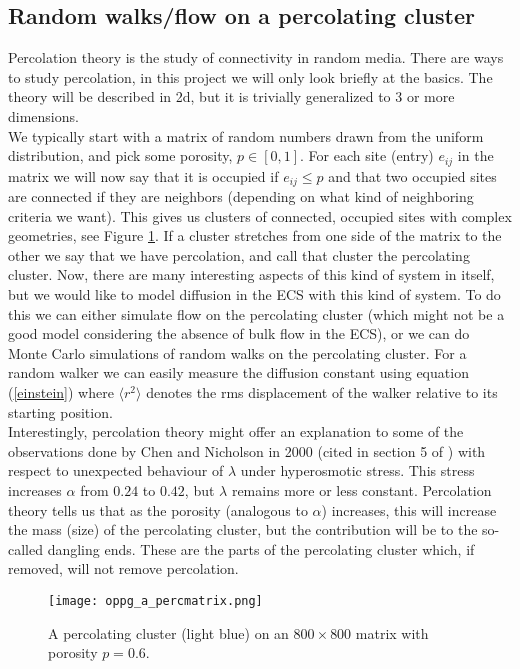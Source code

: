 \documentclass[a4paper,english, 12pt, twoside]{article}
\begin{document}
\subsection{Random walks/flow on a percolating cluster}
Percolation theory is the study of connectivity in random media. There are ways to study percolation, in this project we will only look briefly at the basics. The theory will be described in 2d, but it is trivially generalized to 3 or more dimensions.\\
We typically start with a matrix of random numbers drawn from the uniform distribution, and pick some porosity, $p\in[0,1]$. 
For each site (entry) $e_{ij}$ in the matrix we will now say that it is occupied if $e_{ij} \leq p$ and that two occupied sites are connected if they are neighbors (depending on what kind of neighboring criteria we want). 
This gives us clusters of connected, occupied sites with complex geometries, see Figure \ref{perc}. 
If a cluster stretches from one side of the matrix to the other we say that we have percolation, and call that cluster the percolating cluster. 
Now, there are many interesting aspects of this kind of system in itself, but we would like to model diffusion in the ECS with this kind of system. 
To do this we can either simulate flow on the percolating cluster (which might not be a good model considering the absence of bulk flow in the ECS), or we can do Monte Carlo simulations of random walks on the percolating cluster. 
For a random walker we can easily measure the diffusion constant using equation (\ref{einstein}) where $\langle r^2\rangle$ denotes the rms displacement of the walker relative to its starting position. \\
Interestingly, percolation theory might offer an explanation to some of the observations done by Chen and Nicholson in 2000 (cited in section 5 of \cite{hrabetova2004contribution}) with respect to unexpected behaviour of $\lambda$ under hyperosmotic stress. 
This stress increases $\alpha$ from $0.24$ to $0.42$, but $\lambda$ remains more or less constant. 
Percolation theory tells us that as the porosity (analogous to $\alpha$) increases, this will increase the mass (size) of the percolating cluster, but the contribution will be to the so-called dangling ends. These are the parts of the percolating cluster which, if removed, will not remove percolation.

\begin{figure}[H]
 \centering
 \texttt{[image: oppg\_a\_percmatrix.png]}
 \caption{A percolating cluster (light blue) on an $800\times800$ matrix with porosity $p=0.6$.}
 \label{perc}
\end{figure}
\end{document}
